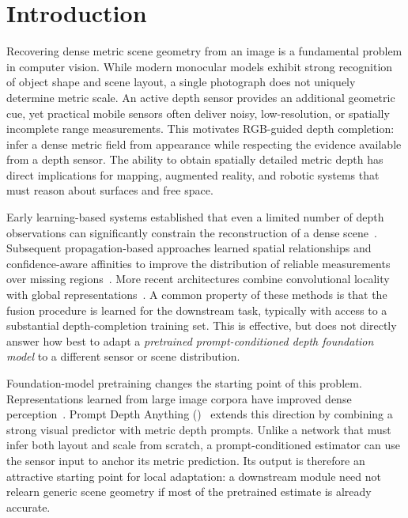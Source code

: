 \section{Introduction}
Recovering dense metric scene geometry from an image is a fundamental problem in computer vision. While modern monocular models exhibit strong recognition of object shape and scene layout, a single photograph does not uniquely determine metric scale. An active depth sensor provides an additional geometric cue, yet practical mobile sensors often deliver noisy, low-resolution, or spatially incomplete range measurements. This motivates RGB-guided depth completion: infer a dense metric field from appearance while respecting the evidence available from a depth sensor. The ability to obtain spatially detailed metric depth has direct implications for mapping, augmented reality, and robotic systems that must reason about surfaces and free space.

Early learning-based systems established that even a limited number of depth observations can significantly constrain the reconstruction of a dense scene~\cite{ma2018sparse}. Subsequent propagation-based approaches learned spatial relationships and confidence-aware affinities to improve the distribution of reliable measurements over missing regions~\cite{cheng2018cspn,park2020nlspn}. More recent architectures combine convolutional locality with global representations~\cite{zhang2023completionformer}. A common property of these methods is that the fusion procedure is learned for the downstream task, typically with access to a substantial depth-completion training set. This is effective, but does not directly answer how best to adapt a \emph{pretrained prompt-conditioned depth foundation model} to a different sensor or scene distribution.

Foundation-model pretraining changes the starting point of this problem. Representations learned from large image corpora have improved dense perception~\cite{oquab2024dinov2,yang2024depthanything,yang2024depthanythingv2}. Prompt Depth Anything (\base)~\cite{lin2025promptda} extends this direction by combining a strong visual predictor with metric depth prompts. Unlike a network that must infer both layout and scale from scratch, a prompt-conditioned estimator can use the sensor input to anchor its metric prediction. Its output is therefore an attractive starting point for local adaptation: a downstream module need not relearn generic scene geometry if most of the pretrained estimate is already accurate.

